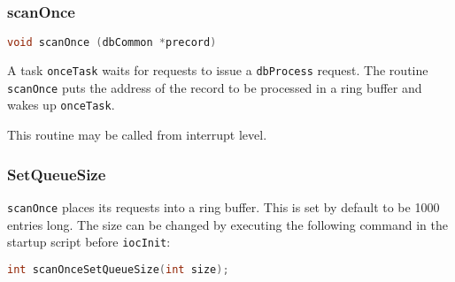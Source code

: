 \subsubsection{scanOnce}

\begin{lstlisting}[language=C]
void scanOnce (dbCommon *precord)
\end{lstlisting}

A task \verb|onceTask| waits for requests to issue a \verb|dbProcess| request.
The routine \verb|scanOnce| puts the address of the record to be processed in a ring buffer and wakes up \verb|onceTask|.

This routine may be called from interrupt level.

\subsubsection{SetQueueSize}

\verb|scanOnce| places its requests into a ring buffer.
This is set by default to be 1000 entries long.
The size can be changed by executing the following command in the startup script before \verb|iocInit|:

\begin{lstlisting}[language=C]
int scanOnceSetQueueSize(int size);
\end{lstlisting}

